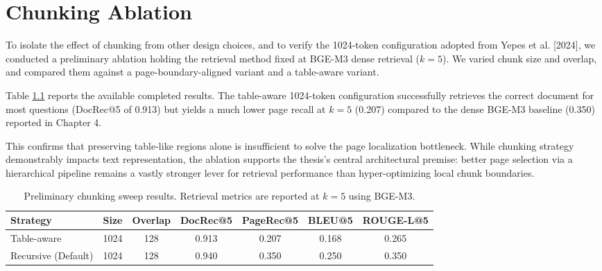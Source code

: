 \documentclass[12pt,twoside,maitrise]{dms}
\theoremstyle{definition}
\numberwithin{equation}{section}
\numberwithin{table}{chapter}
\numberwithin{figure}{chapter}
\begin{document}
\chapter{Chunking Ablation}
\label{app:chunking_ablation}

To isolate the effect of chunking from other design choices, and to verify the 1024-token configuration adopted from Yepes et al. [2024], we conducted a preliminary ablation holding the retrieval method fixed at BGE-M3 dense retrieval ($k=5$). We varied chunk size and overlap, and compared them against a page-boundary-aligned variant and a table-aware variant.

Table \ref{tab:chunking_sweep} reports the available completed results. The table-aware 1024-token configuration successfully retrieves the correct document for most questions (DocRec@5 of 0.913) but yields a much lower page recall at $k=5$ (0.207) compared to the dense BGE-M3 baseline (0.350) reported in Chapter 4. 

This confirms that preserving table-like regions alone is insufficient to solve the page localization bottleneck. While chunking strategy demonstrably impacts text representation, the ablation supports the thesis's central architectural premise: better page selection via a hierarchical pipeline remains a vastly stronger lever for retrieval performance than hyper-optimizing local chunk boundaries.

\begin{table}[htbp]
\centering
\caption{Preliminary chunking sweep results. Retrieval metrics are reported at $k=5$ using BGE-M3.}
\label{tab:chunking_sweep}
\begin{tabular}{lcccccc}
\toprule
\textbf{Strategy} & \textbf{Size} & \textbf{Overlap} & \textbf{DocRec@5} & \textbf{PageRec@5} & \textbf{BLEU@5} & \textbf{ROUGE-L@5} \\
\midrule
Table-aware & 1024 & 128 & 0.913 & 0.207 & 0.168 & 0.265 \\
Recursive (Default) & 1024 & 128 & 0.940 & 0.350 & 0.250 & 0.350 \\
\bottomrule
\end{tabular}
\end{table}
\end{document}
